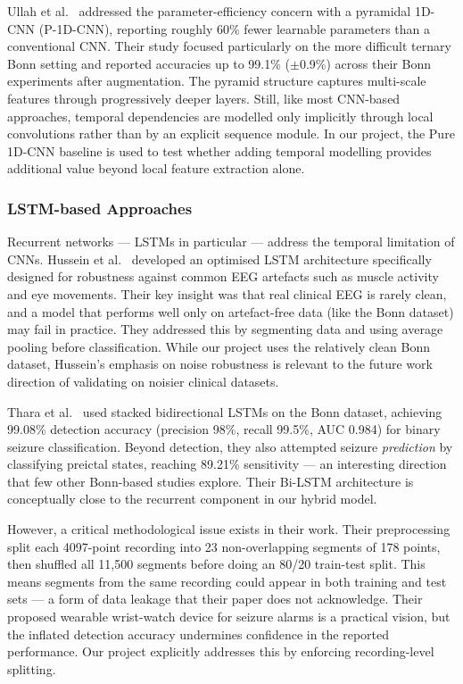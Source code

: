 Ullah et al.\ \cite{ullah2018} addressed the parameter-efficiency concern with a pyramidal 1D-CNN (P-1D-CNN), reporting roughly 60\% fewer learnable parameters than a conventional CNN. Their study focused particularly on the more difficult ternary Bonn setting and reported accuracies up to 99.1\% ($\pm$0.9\%) across their Bonn experiments after augmentation. The pyramid structure captures multi-scale features through progressively deeper layers. Still, like most CNN-based approaches, temporal dependencies are modelled only implicitly through local convolutions rather than by an explicit sequence module. In our project, the Pure 1D-CNN baseline is used to test whether adding temporal modelling provides additional value beyond local feature extraction alone.

\subsubsection{LSTM-based Approaches}

Recurrent networks --- LSTMs in particular --- address the temporal limitation of CNNs. Hussein et al.\ \cite{hussein2019} developed an optimised LSTM architecture specifically designed for robustness against common EEG artefacts such as muscle activity and eye movements. Their key insight was that real clinical EEG is rarely clean, and a model that performs well only on artefact-free data (like the Bonn dataset) may fail in practice. They addressed this by segmenting data and using average pooling before classification. While our project uses the relatively clean Bonn dataset, Hussein's emphasis on noise robustness is relevant to the future work direction of validating on noisier clinical datasets.

Thara et al.\ \cite{thara2019} used stacked bidirectional LSTMs on the Bonn dataset, achieving 99.08\% detection accuracy (precision 98\%, recall 99.5\%, AUC 0.984) for binary seizure classification. Beyond detection, they also attempted seizure \textit{prediction} by classifying preictal states, reaching 89.21\% sensitivity --- an interesting direction that few other Bonn-based studies explore. Their Bi-LSTM architecture is conceptually close to the recurrent component in our hybrid model.

However, a critical methodological issue exists in their work. Their preprocessing split each 4097-point recording into 23 non-overlapping segments of 178 points, then shuffled all 11{,}500 segments before doing an 80/20 train-test split. This means segments from the same recording could appear in both training and test sets --- a form of data leakage that their paper does not acknowledge. Their proposed wearable wrist-watch device for seizure alarms is a practical vision, but the inflated detection accuracy undermines confidence in the reported performance. Our project explicitly addresses this by enforcing recording-level splitting.


